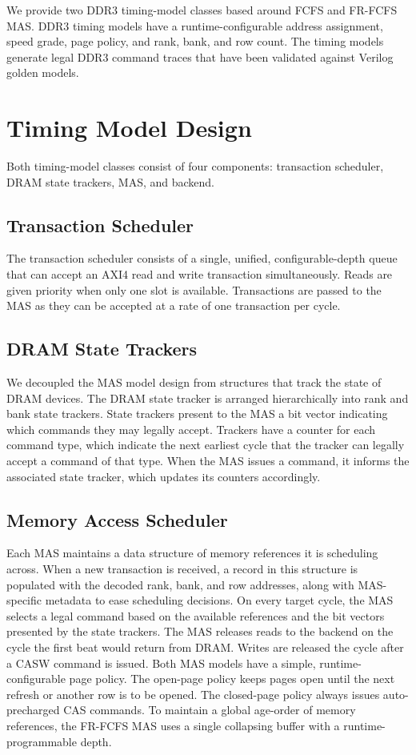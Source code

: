 We provide two DDR3 timing-model classes based around FCFS and FR-FCFS MAS.
DDR3 timing models have a runtime-configurable address assignment, speed grade,
page policy, and rank, bank, and row count. The timing models generate legal
DDR3 command traces that have been validated against Verilog golden models.

\section{Timing Model Design}
Both timing-model classes consist of four components: transaction
scheduler, DRAM state trackers, MAS, and backend.

\subsection{Transaction Scheduler}
The transaction scheduler consists of a single, unified, configurable-depth
queue that can accept an AXI4 read and write transaction simultaneously. Reads
are given priority when only one slot is available.  Transactions are passed to
the MAS as they can be accepted at a rate of one transaction per cycle.

\subsection{DRAM State Trackers}
We decoupled the MAS model design from structures that track the state
of DRAM devices. The DRAM state tracker is arranged hierarchically into rank and
bank state trackers. State trackers present to the MAS a bit vector indicating
which commands they may legally accept. Trackers have a counter for each command
type, which indicate the next earliest cycle that the tracker can legally accept a command of
that type. When the MAS issues a command, it informs the associated state tracker,
which updates its counters accordingly.

\subsection{Memory Access Scheduler}
Each MAS maintains a data structure of memory references it is scheduling across.
When a new transaction is received, a record in this structure is populated with the decoded rank, bank, and row addresses, along with
MAS-specific metadata to ease scheduling decisions.
On every target cycle, the MAS
selects a legal command based on the available references and the bit vectors
presented by the state trackers. The MAS releases reads to the backend on the
cycle the first beat would return from DRAM. Writes are released the cycle after a
CASW command is issued.  Both MAS models have a simple, runtime-configurable
page policy. The open-page policy keeps pages open until the next refresh or another row
is to be opened. The closed-page policy always issues auto-precharged CAS
commands. To maintain a global age-order of memory references, the FR-FCFS MAS
uses a single collapsing buffer with a runtime-programmable depth.

